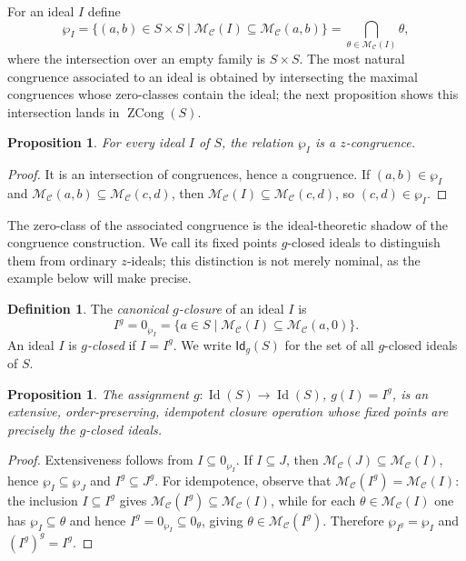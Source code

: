 \documentclass[11pt,leqno]{amsart}
\theoremstyle{plain}
\newtheorem{proposition}[theorem]{Proposition}
\theoremstyle{definition}
\newtheorem{definition}{Definition}[section]
\theoremstyle{remark}
\numberwithin{equation}{section}
\DeclareMathOperator{\Id}{Id}
\DeclareMathOperator{\ZCong}{ZCong}
\newcommand{\GCl}{\mathsf{Id}_{g}}
\newcommand{\MC}{\mathcal M_{\mathcal C}}
\newcommand{\zero}[1]{0_{#1}}
\newcommand{\wpI}[1]{\wp_{#1}}
\begin{document}
For an ideal $I$ define
\begin{equation}\label{eq:wpI}
\wpI{I}=\{(a,b)\in S\times S\mid\MC(I)\subseteq\MC(a,b)\}
       =\bigcap_{\theta\in\MC(I)}\theta,
\end{equation}
where the intersection over an empty family is $S\times S$.
The most natural congruence associated to an ideal is obtained by
intersecting the maximal congruences whose zero-classes contain
the ideal; the next proposition shows this intersection lands in
$\ZCong(S)$.

\begin{proposition}\label{prop:wpI}
For every ideal $I$ of $S$, the relation $\wpI{I}$ is a $z$-congruence.
\end{proposition}
\begin{proof}
It is an intersection of congruences, hence a congruence.
If $(a,b)\in\wpI{I}$ and $\MC(a,b)\subseteq\MC(c,d)$,
then $\MC(I)\subseteq\MC(c,d)$, so $(c,d)\in\wpI{I}$.
\end{proof}

The zero-class of the associated congruence is the ideal-theoretic
shadow of the congruence construction.
We call its fixed points $g$-closed ideals to distinguish them
from ordinary $z$-ideals; this distinction is not merely nominal,
as the example below will make precise.

\begin{definition}\label{def:g-closed-ideals}
The \emph{canonical $g$-closure} of an ideal $I$ is
\[
I^g=\zero{\wpI{I}}=\{a\in S\mid\MC(I)\subseteq\MC(a,0)\}.
\]
An ideal $I$ is \emph{$g$-closed} if $I=I^g$.
We write $\GCl(S)$ for the set of all $g$-closed ideals of $S$.
\end{definition}

\begin{proposition}\label{prop:g-closure-operator}
The assignment $g:\Id(S)\to\Id(S)$, $g(I)=I^g$,
is an extensive, order-preserving, idempotent closure operation
whose fixed points are precisely the $g$-closed ideals.
\end{proposition}
\begin{proof}
Extensiveness follows from $I\subseteq\zero{\wp_I}$.
If $I\subseteq J$, then $\MC(J)\subseteq\MC(I)$,
hence $\wp_I\subseteq\wp_J$ and $I^g\subseteq J^g$.
For idempotence, observe that $\MC(I^g)=\MC(I)$:
the inclusion $I\subseteq I^g$ gives $\MC(I^g)\subseteq\MC(I)$,
while for each $\theta\in\MC(I)$ one has $\wp_I\subseteq\theta$
and hence $I^g=\zero{\wp_I}\subseteq\zero\theta$,
giving $\theta\in\MC(I^g)$.
Therefore $\wp_{I^g}=\wp_I$ and $(I^g)^g=I^g$.
\end{proof}
\end{document}
